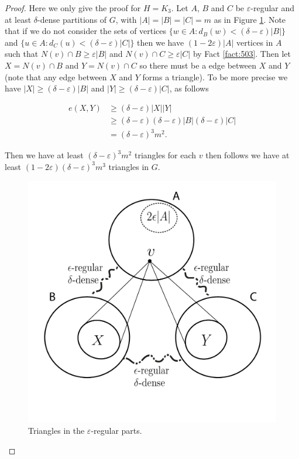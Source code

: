 \documentclass[12pt,twoside,a4paper]{book}
\numberwithin{equation}{section}
\theoremstyle{remark}
\begin{document}
\begin{proof}
Here we only give the proof for $H=K_3$. Let %
 $A$, $B$ and $C$ be $\varepsilon$-regular and at least $\delta$-dense partitions of $G$, with $|A|=|B|=|C|=m$ as in Figure \ref{fig:embeddinglemma}. Note that if we do not consider the sets of vertices $\{w\in A \colon d_B(w) < (\delta - \varepsilon)|B| \}$  and $\{u\in A \colon d_C(u) < (\delta - \varepsilon)|C| \}$ then we have $(1-2\varepsilon)|A|$ vertices in $A$ such that $N(v) \cap B \geq \varepsilon |B|$ and $N(v) \cap C \geq \varepsilon |C|$ by Fact \ref{fact:503}. Then let $X = N(v) \cap B$ and $Y =N(v) \cap C$ so there must be a edge between $X$ and $Y$ (note that any edge between $X$ and $Y$ forms a triangle). To be more precise we have $|X| \geq (\delta - \varepsilon)|B|$ and $|Y| \geq (\delta - \varepsilon)|C|$, as follows

\begin{align*}
e(X,Y) &\geq (\delta - \varepsilon)|X||Y|\\
& \geq (\delta - \varepsilon)  (\delta - \varepsilon)|B|  (\delta - \varepsilon)|C|\\
& =  (\delta - \varepsilon)^3 m^2.
\end{align*}

Then we have at least $ (\delta - \varepsilon)^3 m^2$ triangles for each $v$ then follows we have at least $(1-2\varepsilon) (\delta-\varepsilon)^3 m^3$ triangles in $G$. 

\begin{figure}[H]
     \centering
     \includegraphics[scale=1]{Figuras/embedding-lemma.jpg}
     \caption{Triangles in the $\varepsilon$-regular parts.}
     \label{fig:embeddinglemma}
\end{figure}

\end{proof}
\end{document}
